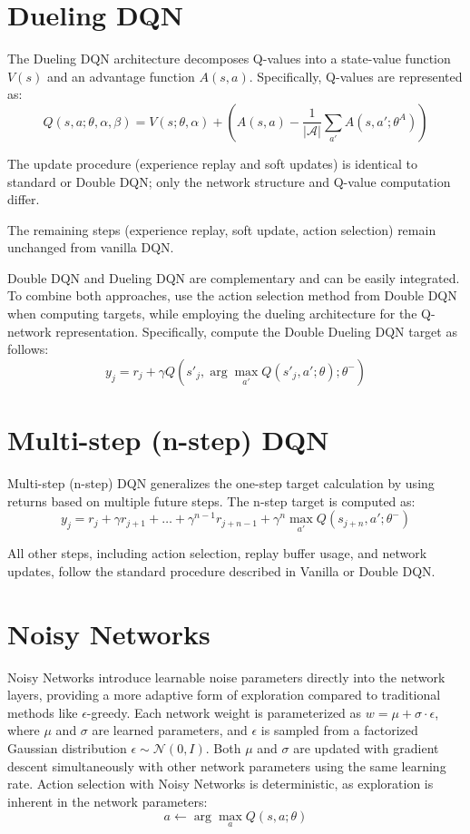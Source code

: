 \documentclass{article}
\begin{document}
\section{Dueling DQN}

The Dueling DQN architecture decomposes Q-values into a state-value function $V(s)$ and an advantage function $A(s,a)$. Specifically, Q-values are represented as:
\[
Q(s,a;\theta, \alpha, \beta) = V(s; \theta, \alpha) + \left(A(s,a) - \frac{1}{|\mathcal{A}|}\sum_{a'} A(s,a'; \theta^A)\right)
\]

The update procedure (experience replay and soft updates) is identical to standard or Double DQN; only the network structure and Q-value computation differ.


The remaining steps (experience replay, soft update, action selection) remain unchanged from vanilla DQN.


Double DQN and Dueling DQN are complementary and can be easily integrated. To combine both approaches, use the action selection method from Double DQN when computing targets, while employing the dueling architecture for the Q-network representation. Specifically, compute the Double Dueling DQN target as follows:
\[
y_j = r_j + \gamma Q\left(s'_j, \arg\max_{a'}Q(s'_j,a';\theta); \theta^{-}\right)
\]

\section{Multi-step (n-step) DQN}

Multi-step (n-step) DQN generalizes the one-step target calculation by using returns based on multiple future steps. The n-step target is computed as:
\[
y_j = r_j + \gamma r_{j+1} + \dots + \gamma^{n-1} r_{j+n-1} + \gamma^n \max_{a'} Q(s_{j+n}, a'; \theta^{-})
\]

All other steps, including action selection, replay buffer usage, and network updates, follow the standard procedure described in Vanilla or Double DQN.

\section{Noisy Networks}

Noisy Networks introduce learnable noise parameters directly into the network layers, providing a more adaptive form of exploration compared to traditional methods like $\epsilon$-greedy. Each network weight is parameterized as $w = \mu + \sigma \cdot \epsilon$, where $\mu$ and $\sigma$ are learned parameters, and $\epsilon$ is sampled from a factorized Gaussian distribution $\epsilon \sim \mathcal{N}(0, I)$. Both $\mu$ and $\sigma$ are updated with gradient descent simultaneously with other network parameters using the same learning rate. Action selection with Noisy Networks is deterministic, as exploration is inherent in the network parameters:
\[
a \leftarrow \arg\max_a Q(s,a;\theta)
\]
\end{document}
